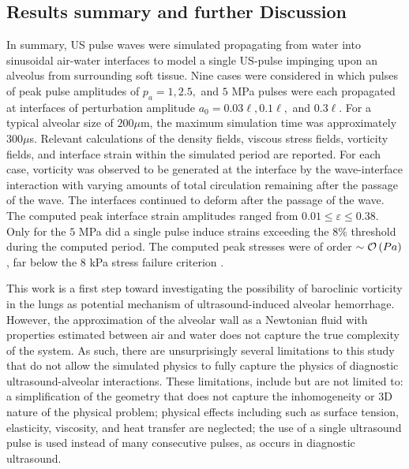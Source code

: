 \subsection{Results summary and further Discussion}
\label{sec:usbe_lung_bio}
In summary, \ac{US} pulse waves were simulated propagating from water
into sinusoidal air-water interfaces to model a single \ac{US}-pulse
impinging upon an alveolus from surrounding soft tissue. Nine cases
were considered in which pulses of peak pulse amplitudes of
$p_a = 1, 2.5,$ and $5$ MPa pulses were each propagated at interfaces
of perturbation amplitude $a_0= 0.03\ell, 0.1\ell,$ and $0.3\ell$. For
a typical alveolar size of $200 \mu$m, the maximum simulation time was
approximately $300 \mu$s. Relevant calculations of the density fields,
viscous stress fields, vorticity fields, and interface strain within
the simulated period are reported. For each case, vorticity was
observed to be generated at the interface by the wave-interface
interaction with varying amounts of total circulation remaining after
the passage of the wave. The interfaces continued to deform after the
passage of the wave. The computed peak interface strain amplitudes
ranged from $0.01 \leq \varepsilon \leq 0.38$. Only for the $5$ MPa
did a single pulse induce strains exceeding the 8\% threshold
\citep{Vlahakis2000} during the computed period. The computed peak
stresses were of order $\sim\mathcal{O}\left(Pa\right)$, far below the $8$ kPa
stress failure criterion \citep{West1991}.

This work is a first step toward investigating the possibility of
baroclinic vorticity in the lungs as potential mechanism of
ultrasound-induced alveolar hemorrhage. However, the approximation of
the alveolar wall as a Newtonian fluid with properties estimated
between air and water does not capture the true complexity of the
system.  As such, there are unsurprisingly several limitations to this
study that do not allow the simulated physics to fully capture the
physics of diagnostic ultrasound-alveolar interactions. These
limitations, include but are not limited to: a simplification of the
geometry that does not capture the inhomogeneity or 3D nature of the
physical problem; physical effects including such as surface tension,
elasticity, viscosity, and heat transfer are neglected; the use of a
single ultrasound pulse is used instead of many consecutive pulses, as
occurs in diagnostic ultrasound.

